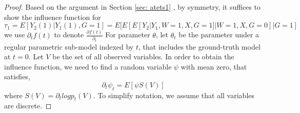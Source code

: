 \documentclass[uplatex,dvipdfmx]{jsarticle}
\begin{document}
\begin{proof}
    Based on the argument in Section \ref{sec: atets1} , by symmetry, it suffices to show the influence function  for$\tau_1 = E[ Y_2(1) | Y_1(1) , G=1] = E[ E[E [ Y_2 | Y_1 ,W=1,X, G=1] | W=1, X, G=0 ] | G=1]$
    we use $ \partial_t f(t) $ to denote $\frac{ \partial f(t) }{ \partial_t } $ For parameter $\theta $, let $ \theta_t $ be the parameter under a regular parametric sub-model indexed by $t$, that includes the ground-truth model at $t=0$.
    Let $V$ be the set of all observed variables. In order to obtain the influence function, we need to find a random variable $\psi $ with mean zero, that satisfies, 
    \begin{equation}
        \partial_t \psi_t = E [ \psi S(V) ]
    \end{equation}
    where $ S(V) = \partial_t log p_t (V) $.
    To simplify notation, we assume that all variables are discrete. 


\end{proof}
\end{document}
